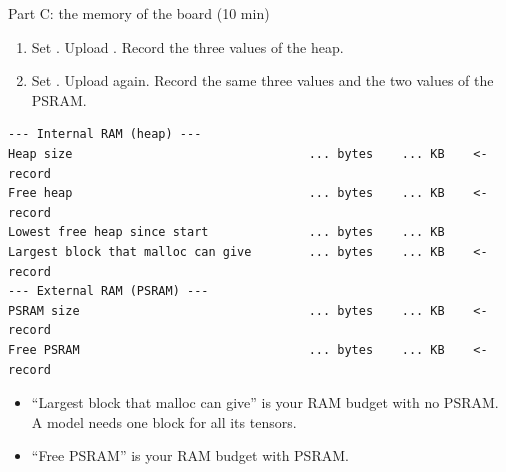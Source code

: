 \begin{frame}[fragile]{Part C: the memory of the board (10 min)}
  \small
  \begin{enumerate}
    \item Set . Upload
          . Record the three values of the
          heap.
    \item Set . Upload again. Record the
          same three values and the two values of the PSRAM.
  \end{enumerate}
  \begin{lstlisting}
--- Internal RAM (heap) ---
Heap size                                 ... bytes    ... KB    <- record
Free heap                                 ... bytes    ... KB    <- record
Lowest free heap since start              ... bytes    ... KB
Largest block that malloc can give        ... bytes    ... KB    <- record
--- External RAM (PSRAM) ---
PSRAM size                                ... bytes    ... KB    <- record
Free PSRAM                                ... bytes    ... KB    <- record
\end{lstlisting}
  \begin{itemize}
    \item ``Largest block that malloc can give'' is your RAM budget with no
          PSRAM. A model needs one block for all its tensors.
    \item ``Free PSRAM'' is your RAM budget with PSRAM.
  \end{itemize}
\end{frame}

